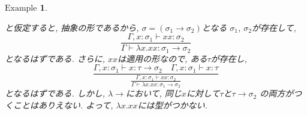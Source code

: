 \documentclass[11pt]{jsreport}
\theoremstyle{mystyle}
\newtheorem{df}{$\textrm{Definition}$}[section]
\newtheorem{ex}[df]{$\textrm{Example}$}
\newtheorem{prop}[df]{$\textrm{Proposition}$}
\newcommand{\T}{\mathbb{T}}
\newcommand{\lama}{\lambda \! \! \to}
\newcommand{\0}{\textbf{0}}
\begin{document}
\begin{ex}
\begin{enumerate}
\[    \]
    と仮定すると, 抽象の形であるから, $\sigma = (\sigma_1 \to \sigma_2)$となる
    $\sigma_1$, $\sigma_2$が存在して, 
    \[
      \frac{\Gamma, x \colon \sigma_1 \vdash xx \colon \sigma_2}
      {\Gamma \vdash \lambda x. xx \colon \sigma_1 \to \sigma_2}
    \]
    となるはずである. さらに, $xx$は適用の形なので, ある$\tau$が存在し, 
    \[
      \frac{\Gamma, x \colon \sigma_1 \vdash x \colon \tau \to \sigma_2
      \quad \Gamma, x \colon \sigma_1 \vdash x \colon \tau}
      {\displaystyle{\frac{\Gamma, x \colon \sigma_1 \vdash xx \colon \sigma_2}
      {\Gamma \vdash \lambda x. xx \colon \sigma_1 \to \sigma_2}}}
    \]
    となるはずである. しかし, $\lama$において, 同じ$x$に対して$\tau$と$\tau \to \sigma_2$
    の両方がつくことはありえない. よって, $\lambda x .xx$には型がつかない. 
  \end{enumerate}
\end{ex}
%
\end{document}
